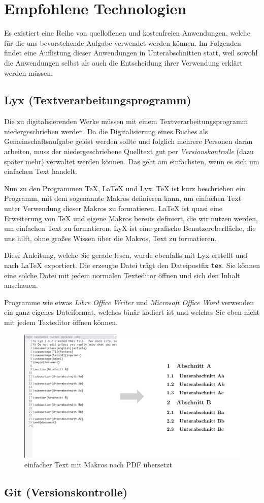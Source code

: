 
\section{Empfohlene Technologien}

Es existiert eine Reihe von quelloffenen und kostenfreien Anwendungen,
welche für die uns bevorstehende Aufgabe verwendet werden können.
Im Folgenden findet eine Auflistung dieser Anwendungen in Unterabschnitten
statt, weil sowohl die Anwendungen selbst als auch die Entscheidung
ihrer Verwendung erklärt werden müssen.

\subsection{Lyx (Textverarbeitungsprogramm)}

Die zu digitalisierenden Werke müssen mit einem Textverarbeitungsprogramm
niedergeschrieben werden. Da die Digitalisierung eines Buches als
Gemeinschaftsaufgabe gelöst werden sollte und folglich mehrere Personen
daran arbeiten, muss der niedergeschriebene Quelltext gut per \emph{Versionskontrolle}
(dazu später mehr) verwaltet werden können. Das geht am einfachsten,
wenn es sich um einfachen Text handelt.

Nun zu den Programmen \TeX{}, \LaTeX{} und Lyx. \TeX{} ist kurz beschrieben
ein Programm, mit dem sogenannte Makros definieren kann, um einfachen
Text unter Verwendung dieser Makros zu formatieren. \LaTeX{} ist quasi
eine Erweiterung von \TeX{} und eigene Makros bereits definiert, die
wir nutzen werden, um einfachen Text zu formatieren. LyX ist eine
grafische Benutzeroberfläche, die uns hilft, ohne großes Wissen über
die Makros, Text zu formatieren.

Diese Anleitung, welche Sie gerade lesen, wurde ebenfalls mit Lyx
erstellt und nach \LaTeX{} exportiert. Die erzeugte Datei trägt den
Dateipostfix \texttt{tex}. Sie können eine solche Datei mit jedem
normalen Texteditor öffnen und sich den Inhalt anschauen.

Programme wie etwas \emph{Libre Office Writer} und \emph{Microsoft
Office Word} verwenden ein ganz eigenes Dateiformat, welches binär
kodiert ist und welches Sie eben nicht mit jedem Texteditor öffnen
können.

\begin{figure}
\centering{}\includegraphics{image_1}\caption{einfacher Text mit Makros nach PDF übersetzt}
\end{figure}


\subsection{Git (Versionskontrolle)}

